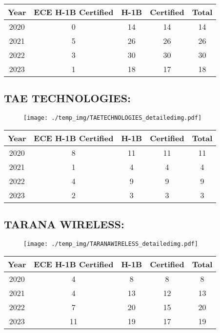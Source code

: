 \documentclass{article}%
\begin{document}
%
\begin{longtable}{c|c|c|c|c}%
\hline%
Year&ECE H{-}1B Certified&H{-}1B&Certified&Total\\%
\hline%
2020&0&14&14&14\\%
\hline%
2021&5&26&26&26\\%
\hline%
2022&3&30&30&30\\%
\hline%
2023&1&18&17&18\\%
\hline%
\end{longtable}

%
\newpage%
\subsection{TAE TECHNOLOGIES:}%
\label{subsec:TAETECHNOLOGIES}%
\label{TAETECHNOLOGIESdetailed}%


\begin{figure}[htbp]%
\centering%
\texttt{[image: ./temp\_img/TAETECHNOLOGIES\_detailedimg.pdf]}%
\end{figure}

%
\begin{longtable}{c|c|c|c|c}%
\hline%
Year&ECE H{-}1B Certified&H{-}1B&Certified&Total\\%
\hline%
2020&8&11&11&11\\%
\hline%
2021&1&4&4&4\\%
\hline%
2022&4&9&9&9\\%
\hline%
2023&2&3&3&3\\%
\hline%
\end{longtable}

%
\newpage%
\subsection{TARANA WIRELESS:}%
\label{subsec:TARANAWIRELESS}%
\label{TARANAWIRELESSdetailed}%


\begin{figure}[htbp]%
\centering%
\texttt{[image: ./temp\_img/TARANAWIRELESS\_detailedimg.pdf]}%
\end{figure}

%
\begin{longtable}{c|c|c|c|c}%
\hline%
Year&ECE H{-}1B Certified&H{-}1B&Certified&Total\\%
\hline%
2020&4&8&8&8\\%
\hline%
2021&4&13&12&13\\%
\hline%
2022&7&20&15&20\\%
\hline%
2023&11&19&17&19\\%
\hline%
\end{longtable}
\end{document}
